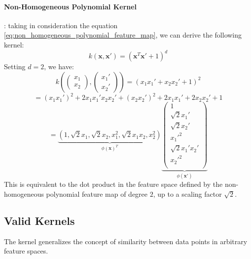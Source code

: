 \paragraph{Non-Homogeneous Polynomial Kernel}:
\label{par:non_homogeneous_polynomial_kernel}
taking in consideration the equation \ref{eq:non_homogeneous_polynomial_feature_map}, we can derive the following kernel:
\begin{equation}
    k(\boldsymbol{x}, \boldsymbol{x}') = (\boldsymbol{x}^T \boldsymbol{x}' + 1)^d
\end{equation}
Setting $d=2$, we have:
\[
    k(\begin{pmatrix} x_1 \\ x_2 \end{pmatrix}, \begin{pmatrix} x_1' \\ x_2' \end{pmatrix}) = (x_1 x_1' + x_2 x_2' + 1)^2
\]
\[
    = (x_1 x_1')^2 + 2 x_1 x_1' x_2 x_2' + (x_2 x_2')^2 + 2 x_1 x_1' + 2 x_2 x_2' + 1
\]
\[ = \underbrace{(1, \sqrt{2} x_1, \sqrt{2} x_2, x_1^2, \sqrt{2} x_1 x_2, x_2^2)}_{\phi(\boldsymbol{x})^T}
\underbrace{
    \begin{pmatrix}
    1 \\
    \sqrt{2} x_1' \\
    \sqrt{2} x_2' \\
    x_1'^2 \\
    \sqrt{2} x_1' x_2' \\
    x_2'^2 \\
    \end{pmatrix}
}_{\phi(\boldsymbol{x}')}
\]
This is equivalent to the dot product in the feature space defined by the non-homogeneous polynomial feature map of degree $2$, up to a scaling factor $\sqrt{2}$.

\subsection{Valid Kernels}
The kernel generalizes the concept of similarity between data points in arbitrary feature spaces.
\begin{figure}[H]
\end{figure}

